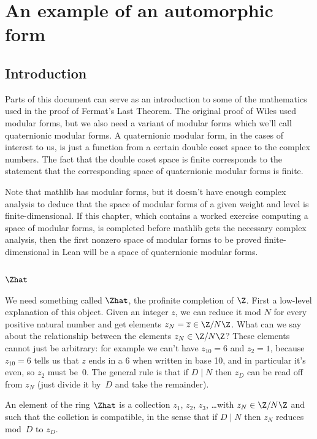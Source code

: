 \chapter{An example of an automorphic form}

\section{Introduction}
Parts of this document can serve as an introduction to some of the mathematics used in the proof of
Fermat's Last Theorem. The original proof of Wiles used modular forms, but we also need a
variant of modular forms which we'll call quaternionic modular forms. A quaternionic modular
form, in the cases of interest to us, is just a function from a certain double coset space
to the complex numbers. The fact that the double coset space is finite corresponds to the statement
that the corresponding space of quaternionic modular forms is finite.

Note that mathlib has modular forms, but it doesn't have enough complex analysis to deduce
that the space of modular forms of a given weight and level is finite-dimensional. If this
chapter, which contains a worked exercise computing a space of modular forms, is completed
before mathlib gets the necessary complex analysis, then the first nonzero space of modular forms
to be proved finite-dimensional in Lean will be a space of quaternionic modular forms.


\section{$\Zhat$}

We need something called $\Zhat$, the profinite completion of $\Z$. First a low-level explanation
of this object. Given an integer $z$, we can reduce it mod $N$ for every positive natural
number and get elements $z_N=\overline{z}\in\Z/N\Z$. What can we say 
about the relationship between the elements $z_N\in\Z/N\Z$? These elements cannot just be
arbitrary: for example we can't have $z_{10}=6$ and $z_2=1$, because $z_{10}=6$ tells us that
$z$ ends in a 6 when written in base 10, and in particular it's even, so $z_2$ must be~0.
The general rule is that if $D\mid N$ then $z_D$ can be read off from $z_N$ (just divide it by~$D$
and take the remainder).

An element of the ring $\Zhat$ is a collection $z_1$, $z_2$, $z_3$, \ldots with $z_N\in\Z/N\Z$
and such that the colletion is compatible, in the sense that if $D\mid N$ then $z_N$ reduces mod~$D$
to $z_D$.

